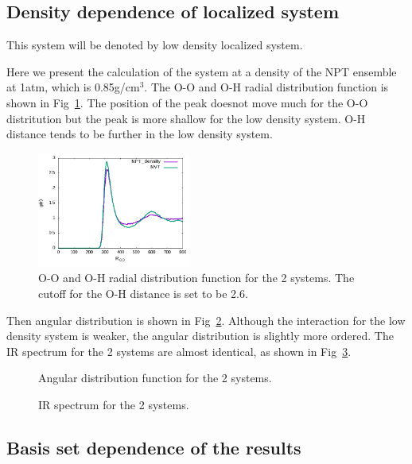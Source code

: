 \documentclass[aps,prl,reprint,amsmath,amssymb]{revtex4-1}
\begin{document}
\subsection{Density dependence of localized system} 

This system will be denoted by low density localized system.

Here we present the calculation of the system at a density of the NPT ensemble at 1atm, which is 0.85g/cm$^3$. 
The O-O and O-H radial distribution function is shown in Fig~\ref{Fig:rdf_cp}. 
The position of the peak doesnot move much for the O-O distritution but the peak is more shallow for the low density system. 
O-H distance tends to be further in the low density system.

\begin{figure}
\includegraphics[width=0.45\textwidth]{rdf_NVT_CPDNVT.png}
\caption{O-O and O-H radial distribution function for the 2 systems. The cutoff for the O-H distance is set to be 2.6\Ang.}\label{Fig:rdf_cp}
\end{figure} 

Then angular distribution is shown in Fig~\ref{Fig:adfcp}. 
Although the interaction for the low density system is weaker, the angular distribution is slightly more ordered. 
The IR spectrum for the 2 systems are almost identical, as shown in Fig~\ref{Fig:ir_cp}.

\begin{figure}
\caption{Angular distribution function for the 2 systems.}\label{Fig:adfcp}
\end{figure} 

\begin{figure}
\caption{IR spectrum for the 2 systems.}\label{Fig:ir_cp}
\end{figure} 

\subsection{Basis set dependence of the results}
\end{document}

